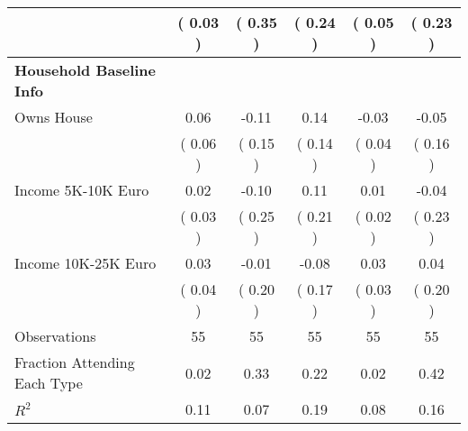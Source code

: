 \begin{table}[H]
{\begin{tabular}{lccccc}
\quad  & (     0.03 ) & (     0.35 )  & \textbf{(     0.24 )}  & (     0.05 ) & \textbf{(     0.23 )} \\
\midrule
\textbf{Household Baseline Info} \\
\quad Owns House &      0.06 &     -0.11 &      0.14 &     -0.03 &     -0.05 \\
\quad  & (     0.06 ) & (     0.15 )  & (     0.14 )  & (     0.04 ) & (     0.16 ) \\
\quad Income 5K-10K Euro &      0.02 &     -0.10 &      0.11 &      0.01 &     -0.04 \\
\quad  & (     0.03 ) & (     0.25 )  & (     0.21 )  & (     0.02 ) & (     0.23 ) \\
\quad Income 10K-25K Euro &      0.03 &     -0.01 &     -0.08 &      0.03 &      0.04 \\
\quad  & (     0.04 ) & (     0.20 )  & (     0.17 )  & (     0.03 ) & (     0.20 ) \\
\midrule
Observations & 55 & 55 & 55 & 55 & 55 \\
Fraction Attending Each Type &      0.02 &      0.33 &      0.22 &      0.02 &      0.42 \\
\midrule
$ R^2$ &      0.11 &      0.07 &      0.19 &      0.08 &      0.16 \\
\bottomrule
\end{tabular}}
\end{table}
